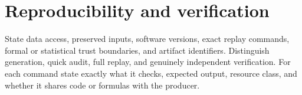 \section{Reproducibility and verification}

State data access, preserved inputs, software versions, exact replay commands,
formal or statistical trust boundaries, and artifact identifiers. Distinguish
generation, quick audit, full replay, and genuinely independent verification.
For each command state exactly what it checks, expected output, resource class,
and whether it shares code or formulas with the producer.
